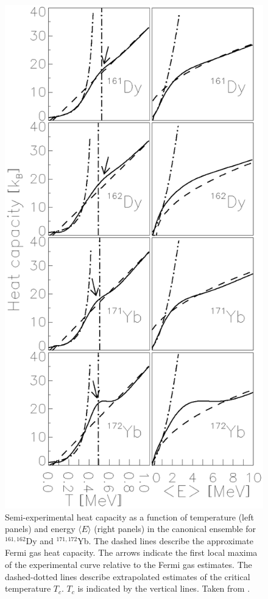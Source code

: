 \documentclass[rmp,aps,floatfix]{revtex4}
\begin{document}
\begin{figure}\centering
\includegraphics[totalheight=16cm]{dean_hjorthjensen_fig29.ps}
\caption{Semi-experimental heat capacity as a function of temperature (left 
panels) and energy $\langle E\rangle$ (right panels) in the canonical ensemble 
for $^{161,162}$Dy and $^{171,172}$Yb. The dashed lines describe the 
approximate Fermi gas heat capacity. The arrows indicate the first local 
maxima of the experimental curve relative to the Fermi gas estimates. The 
dashed-dotted lines describe extrapolated estimates of 
the critical temperature $T_c$. $T_c$ is indicated
by the vertical lines. 
Taken from \cite{schiller2001}.}
\label{fig:heatcapacity} 
\end{figure}
\end{document}
